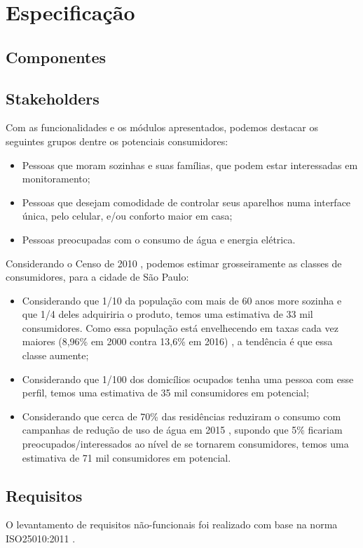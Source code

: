 \chapter{Especificação}

\section{Componentes}

\section{Stakeholders}
Com as funcionalidades e os módulos apresentados,  podemos destacar os seguintes grupos dentre os potenciais consumidores:
\begin{itemize}
\item Pessoas que moram sozinhas e suas famílias, que podem estar interessadas em monitoramento;
\item Pessoas que desejam comodidade de controlar seus aparelhos numa interface única, pelo celular, e/ou conforto maior em casa;
\item Pessoas preocupadas com o consumo de água e energia elétrica.
\end{itemize}

Considerando o Censo de 2010 \cite{ibge}, podemos estimar grosseiramente as classes de consumidores, para a cidade de São Paulo:

\begin{itemize}
\item Considerando que 1/10 da população com mais de 60 anos more sozinha e que 1/4 deles adquiriria o produto, temos uma estimativa de 33 mil consumidores. Como essa população está envelhecendo em taxas cada vez maiores (8,96\% em 2000 contra 13,6\% em 2016) \cite{bibliotecaVirtual}, a tendência é que essa classe aumente;
\item Considerando que 1/100 dos domicílios ocupados tenha uma pessoa com esse perfil, temos uma estimativa de 35 mil consumidores em potencial;
\item Considerando que cerca de 70\% das residências reduziram o consumo com campanhas de redução de uso de água em 2015 \cite{g1}, supondo que 5\% ficariam preocupados/interessados ao nível de se tornarem consumidores, temos uma estimativa de 71 mil consumidores em potencial.
\end{itemize}

\section{Requisitos}
O levantamento de requisitos não-funcionais foi realizado com base na norma ISO25010:2011 \cite{iso25010}.

